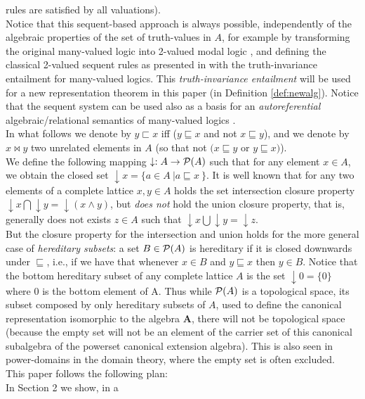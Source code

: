 \documentclass[10pt,twocolumn]{article}
\begin{document}
 rules are satisfied by all valuations).\\
Notice that this sequent-based approach is always possible,
independently of the algebraic properties of the set of truth-values
in $A$, for example by transforming the original many-valued logic
into 2-valued modal logic \cite{MajkC04,Majk06MV}, and defining the
classical 2-valued sequent rules as presented in \cite{Majk09BS}
with the truth-invariance entailment for many-valued logics. This
\emph{truth-invariance entailment} will be used for a new
representation theorem in this paper (in Definition
\ref{def:newalg}). Notice that the sequent system can be used also
as a basis for an \emph{autoreferential} algebraic/relational
semantics of many-valued logics \cite{Majk06ml}.\\
In what follows we denote by $y \sqsubset x$ iff ($y \sqsubseteq x$
and not $x \sqsubseteq y$), and we denote by $x \bowtie y$ two
unrelated elements in $A$ (so that not $(x\sqsubseteq y$ or
$y\sqsubseteq x)$).\\
We define the following mapping $\downarrow:A \rightarrow \P(A)$
such that for any  element $x \in A$, we obtain the closed set
$\downarrow x = \{a \in A~| a \sqsubseteq x~\}$. It is well known
that for any two elements of a complete lattice $x, y \in A$ holds
the set intersection closure property $ \downarrow x \bigcap
\downarrow y = \downarrow (x \wedge y)$, but \emph{does not} hold
the union closure property, that is, generally  does not exists $z
\in A$  such
that $ \downarrow x \bigcup  \downarrow y = \downarrow z$. \\
But the closure property for the intersection and union holds for
the more general case of \emph{hereditary subsets}: a set $B \in
\P(A)$ is hereditary if it is closed downwards under $\sqsubseteq$,
i.e., if we have that whenever $x \in B$ and $y \sqsubseteq x$ then
$y \in B$. Notice that the bottom hereditary subset of any complete
lattice $A$ is the set $\downarrow 0 = \{ 0 \}$ where $0$ is the
bottom element of A. Thus while $\P(A)$ is a topological space, its
subset composed by only hereditary subsets of $A$, used to define
the canonical representation isomorphic to the algebra $\textbf{A}$,
there will not be topological space (because the empty set will not
be an element of the carrier set of this canonical subalgebra of the
powerset canonical extension
algebra). This is also seen in power-domains in the domain theory, where the empty set is often excluded.\\
This paper follows the following plan:\\In Section 2 we show, in a
\end{document}
